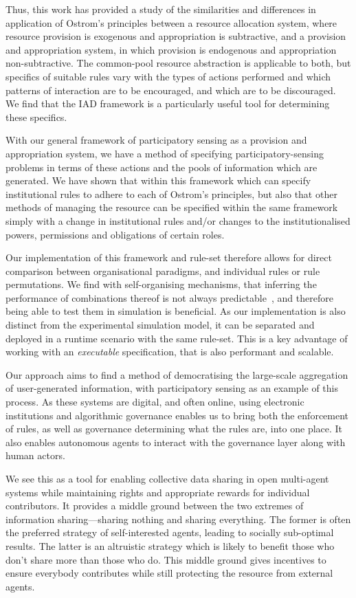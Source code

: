 Thus, this work has provided a study of the similarities and differences in
application of Ostrom's principles between a resource allocation system, where
resource provision is exogenous and appropriation is subtractive, and a
provision and appropriation system, in which provision is endogenous and
appropriation non-subtractive. The common-pool resource abstraction is
applicable to both, but specifics of suitable rules vary with the types of
actions performed and which patterns of interaction are to be encouraged, and
which are to be discouraged. We find that the \ac{IAD} framework is a
particularly useful tool for determining these specifics.

With our general framework of participatory sensing as a provision and
appropriation system, we have a method of specifying participatory-sensing
problems in terms of these actions and the pools of information which are
generated. We have shown that within this framework which can specify
institutional rules to adhere to each of Ostrom's principles, but also that
other methods of managing the resource can be specified within the same
framework simply with a change in institutional rules and/or changes to the
institutionalised powers, permissions and obligations of certain roles.

Our implementation of this framework and rule-set therefore allows for direct
comparison between organisational paradigms, and individual rules or rule
permutations. We find with self-organising mechanisms, that inferring the
performance of combinations thereof is not always
predictable~\citep{Sanderson2013}, and therefore being able to test them in
simulation is beneficial. As our implementation is also distinct from the
experimental simulation model, it can be separated and deployed in a runtime
scenario with the same rule-set. This is a key advantage of working with an
\emph{executable} specification, that is also performant and scalable.

Our approach aims to find a method of democratising the large-scale
aggregation of user-generated information, with participatory sensing as an
example of this process. As these systems are digital, and often online, using
electronic institutions and algorithmic governance enables us to bring both
the enforcement of rules, as well as governance determining what the rules
are, into one place. It also enables autonomous agents to interact with the
governance layer along with human actors.

We see this as a tool for enabling collective data sharing in open multi-agent
systems while maintaining rights and appropriate rewards for individual
contributors. It provides a middle ground between the two extremes of
information sharing---sharing nothing and sharing everything. The former is
often the preferred strategy of self-interested agents, leading to socially
sub-optimal results. The latter is an altruistic strategy which is likely to
benefit those who don't share more than those who do. This middle ground gives
incentives to ensure everybody contributes while still protecting the resource
from external agents.

